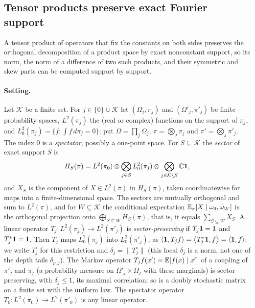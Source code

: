 \subsection{Tensor products preserve exact Fourier support}\label{subsec:lifts:sectors}

A tensor product of operators that fix the constants on both sides preserves
the orthogonal decomposition of a product space by exact nonconstant support,
so its norm, the norm of a difference of two such products, and their symmetric
and skew parts can be computed support by support.

\paragraph{Setting.} Let $\mathcal K$ be a finite set. For
$j\in\{0\}\cup\mathcal K$ let $(\Omega_j,\pi_j)$ and $(\Omega'_j,\pi'_j)$ be
finite probability spaces, $L^2(\pi_j)$ the (real or complex) functions on the
support of $\pi_j$, and $L^2_0(\pi_j)=\{f:\int f\,d\pi_j=0\}$; put
$\Omega=\prod_j\Omega_j$, $\pi=\bigotimes_j\pi_j$ and
$\pi'=\bigotimes_j\pi'_j$. The index $0$ is a
\emph{spectator}, possibly a one-point space. For $S\subseteq\mathcal K$ the
\emph{sector} of exact support $S$ is
\[
 H_S(\pi)=L^2(\pi_0)\otimes\bigotimes_{j\in S}L^2_0(\pi_j)\otimes
 \bigotimes_{j\in\mathcal K\setminus S}\mathbb C\mathbf 1 ,
\]
and $X_S$ is the component of $X\in L^2(\pi)$ in $H_S(\pi)$, taken
coordinatewise for maps into a finite-dimensional space. The sectors are
mutually orthogonal and sum to $L^2(\pi)$, and for $W\subseteq\mathcal K$ the
conditional expectation $\mathbb E_\pi[X\mid\omega_0,\omega_W]$ is the orthogonal
projection onto $\bigoplus_{S\subseteq W}H_S(\pi)$, that is, it equals
$\sum_{S\subseteq W}X_S$. A linear operator $T_j\colon L^2(\pi_j)\to L^2(\pi'_j)$
is \emph{sector-preserving} if $T_j\mathbf 1=\mathbf 1$ and $T_j^*\mathbf 1=\mathbf 1$. Then $T_j$
maps $L^2_0(\pi_j)$ into $L^2_0(\pi'_j)$, as
$\left\langle \mathbf 1,T_jf\right\rangle=\left\langle T_j^*\mathbf 1,f\right\rangle=\left\langle \mathbf 1,f\right\rangle$; we write $T_j^\circ$ for this
restriction and $\delta_j=\|T_j^\circ\|$ (this local $\delta_j$
is a norm, not one of the depth tails $\delta_{p,j}$). The Markov
operator
$T_jf(x')=\mathbb E[f(x)\mid x']$ of a coupling of $\pi'_j$ and $\pi_j$ (a probability
measure on $\Omega'_j\times\Omega_j$ with these marginals) is sector-preserving,
with $\delta_j\le1$, its maximal correlation; so is a doubly stochastic matrix
on a finite set with the uniform law. The spectator operator
$T_0\colon L^2(\pi_0)\to L^2(\pi'_0)$ is any linear operator.

